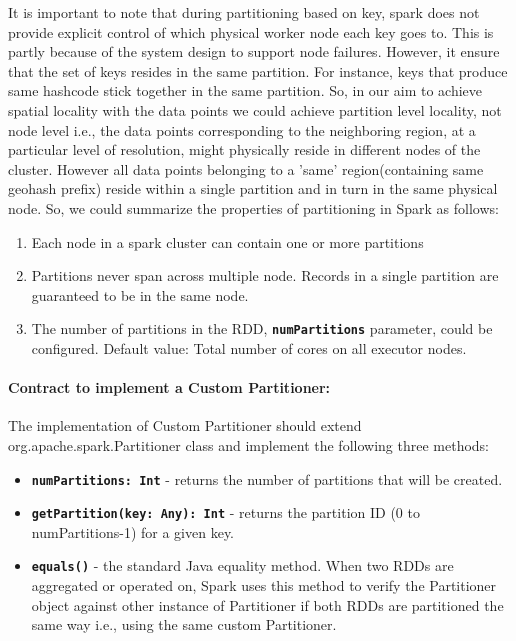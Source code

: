 \documentclass[article,type=msc,colorback,12pt,accentcolor=tud1d]{tudthesis}
\begin{document}
			\par It is important to note that during partitioning based on key, spark does not provide explicit control of which physical worker node each key goes to. This is partly because of the system design to support node failures.\cite{sparkbook} However, it ensure that the set of keys resides in the same partition. For instance, keys that produce same hashcode stick together  in the same partition. So, in our aim to achieve spatial locality with the data points we could achieve partition level locality, not node level i.e., the data points corresponding to the neighboring region, at a particular level of resolution, might physically reside in different nodes of the cluster. However all data points belonging to a 'same' region(containing same geohash prefix) reside within a single partition and in turn in the same physical node. So, we could summarize the properties of partitioning in Spark as follows: \cite{partitioningHeather} 
			 
			 \begin{enumerate}
			 	\item Each node in a spark cluster can contain one or more partitions
			 \item Partitions never span across multiple node. Records in a single partition are guaranteed to be in the same node.
			\item  The number of partitions in the RDD, \texttt{\textbf{numPartitions}} parameter, could be configured. Default value: Total number of cores on all executor nodes.
			 \end{enumerate}
			
		\paragraph{	Contract to implement a Custom Partitioner: }
			The implementation of Custom Partitioner should extend org.apache.spark.Partitioner class and implement the following three methods:\cite{sparkbook}
			
			\begin{itemize}
				\item \textbf{\texttt{numPartitions: Int}} - returns the number of partitions that will be created.
				\item \textbf{\texttt{getPartition(key: Any): Int}} - returns the partition ID (0 to numPartitions-1) for a given key.
				\item \textbf{\texttt{equals()}} - the standard Java equality method. When two RDDs are aggregated or operated on, Spark uses this method to verify the Partitioner object against other instance of Partitioner if both RDDs are partitioned the same way i.e., using the same custom Partitioner.
			\end{itemize}
			
\end{document}
